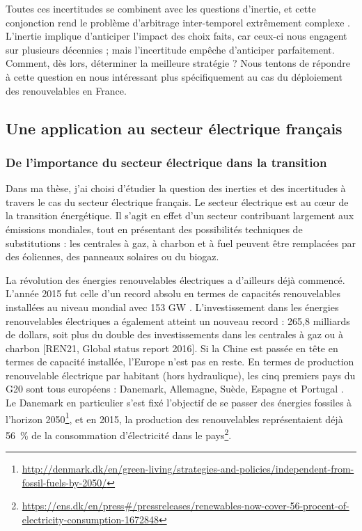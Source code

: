 Toutes ces incertitudes se combinent avec les questions d’inertie, et cette conjonction rend le problème d’arbitrage inter-temporel extrêmement complexe \citep{Duong1997}. L’inertie implique d’anticiper l’impact des choix faits, car ceux-ci nous engagent sur plusieurs décennies ; mais l’incertitude empêche d’anticiper parfaitement. Comment, dès lors, déterminer la meilleure stratégie ? Nous tentons de répondre à cette question en nous intéressant plus spécifiquement au cas du déploiement des renouvelables en France.

\subsection{Une application au secteur électrique français}

\subsubsection{De l’importance du secteur électrique dans la transition}
Dans ma thèse, j’ai choisi d’étudier la question des inerties et des incertitudes à travers le cas du secteur électrique français. Le secteur électrique est au cœur de la transition énergétique. Il s’agit en effet d’un secteur contribuant largement aux émissions mondiales, tout en présentant des possibilités techniques de substitutions : les centrales à gaz, à charbon et à fuel peuvent être remplacées par des éoliennes, des panneaux solaires ou du biogaz.

La révolution des énergies renouvelables électriques a d’ailleurs déjà commencé. L’année 2015 fut celle d’un record absolu en termes de capacités renouvelables installées au niveau mondial avec 153 GW \citep{InternationalEnergyAgency2016}. L’investissement dans les énergies renouvelables électriques a également atteint un nouveau record : 265,8 milliards de dollars, soit plus du double des investissements dans les centrales à gaz ou à charbon [REN21, Global status report 2016]. 
Si la Chine est passée en tête en termes de capacité installée, l’Europe n’est pas en reste. En termes de production renouvelable électrique par habitant (hors hydraulique), les cinq premiers pays du G20 sont tous européens : Danemark, Allemagne, Suède, Espagne et Portugal \citep[p. 21]{REN212016}. Le Danemark en particulier s’est fixé l’objectif de se passer des énergies fossiles à l’horizon 2050\footnote{\url{http://denmark.dk/en/green-living/strategies-and-policies/independent-from-fossil-fuels-by-2050/}}, et en 2015, la production des renouvelables représentaient déjà 56~\% de la consommation d'électricité dans le pays\footnote{\url{https://ens.dk/en/press\#/pressreleases/renewables-now-cover-56-procent-of-electricity-consumption-1672848}}. 

